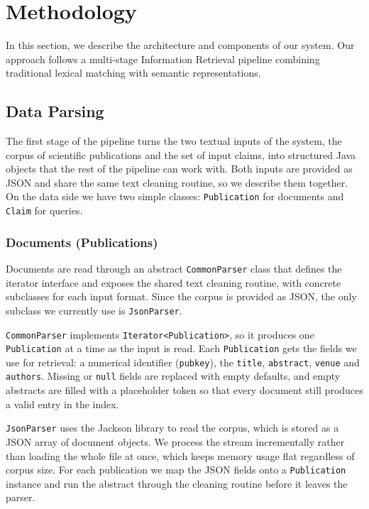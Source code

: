 \newpage
\section{Methodology}
\label{sec:methodology}

In this section, we describe the architecture and components of our system. Our approach follows a multi-stage Information Retrieval pipeline combining traditional lexical matching with semantic representations.

\subsection{Data Parsing}

The first stage of the pipeline turns the two textual inputs of the system, the corpus of scientific publications and the set of input claims, into structured Java objects that the rest of the pipeline can work with. Both inputs are provided as JSON and share the same text cleaning routine, so we describe them together. On the data side we have two simple classes: \texttt{Publication} for documents and \texttt{Claim} for queries.

\subsubsection{Documents (Publications)}

Documents are read through an abstract \texttt{CommonParser} class that defines the iterator interface and exposes the shared text cleaning routine, with concrete subclasses for each input format. Since the corpus is provided as JSON, the only subclass we currently use is \texttt{JsonParser}.

\texttt{CommonParser} implements \texttt{Iterator<Publication>}, so it produces one \texttt{Publication} at a time as the input is read. Each \texttt{Publication} gets the fields we use for retrieval: a numerical identifier (\texttt{pubkey}), the \texttt{title}, \texttt{abstract}, \texttt{venue} and \texttt{authors}. Missing or \texttt{null} fields are replaced with empty defaults, and empty abstracts are filled with a placeholder token so that every document still produces a valid entry in the index.

\texttt{JsonParser} uses the Jackson library to read the corpus, which is stored as a JSON array of document objects. We process the stream incrementally rather than loading the whole file at once, which keeps memory usage flat regardless of corpus size. For each publication we map the JSON fields onto a \texttt{Publication} instance and run the abstract through the cleaning routine before it leaves the parser.


